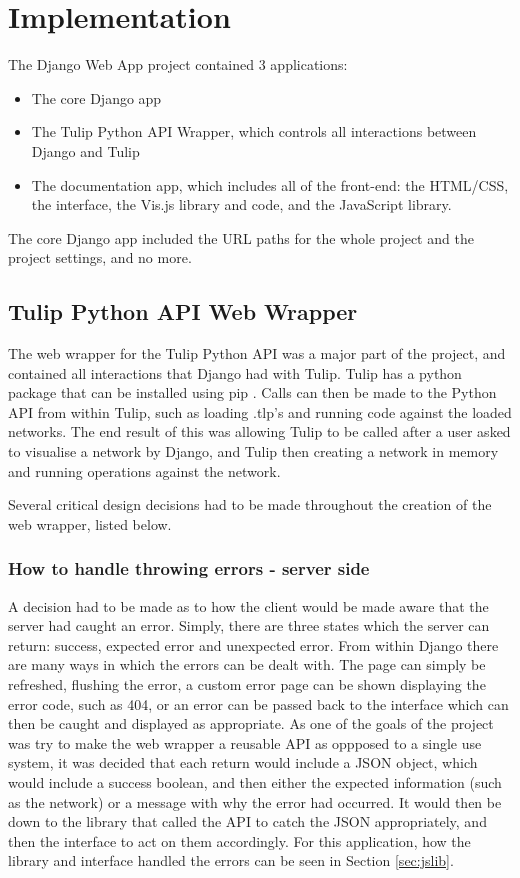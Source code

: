\documentclass[../dissertation.tex]{subfiles}
\begin{document}
\chapter{Implementation}

The Django Web App project contained 3 applications: 

\begin{itemize}
    \item The core Django app
    \item The Tulip Python API Wrapper, which controls all interactions between Django and Tulip
    \item The documentation app, which includes all of the front-end: the HTML/CSS, the interface, the Vis.js library and code, and the JavaScript library.
\end{itemize}

The core Django app included the URL paths for the whole project and the project settings, and no more.

\section{Tulip Python API Web Wrapper}

The web wrapper for the Tulip Python API was a major part of the project, and contained all interactions that Django had with Tulip. Tulip has a python package \cite{tulippip} that can be installed using pip \cite{pip}. Calls can then be made to the Python API from within Tulip, such as loading .tlp's and running code against the loaded networks. The end result of this was allowing Tulip to be called after a user asked to visualise a network by Django, and Tulip then creating a network in memory and running operations against the network. 

Several critical design decisions had to be made throughout the creation of the web wrapper, listed below.

\subsection{How to handle throwing errors - server side}

A decision had to be made as to how the client would be made aware that the server had caught an error. Simply, there are three states which the server can return: success, expected error and unexpected error. From within Django there are many ways in which the errors can be dealt with. The page can simply be refreshed, flushing the error, a custom error page can be shown displaying the error code, such as 404, or an error can be passed back to the interface which can then be caught and displayed as appropriate. As one of the goals of the project was try to make the web wrapper a reusable API as oppposed to a single use system, it was decided that each return would include a JSON object, which would include a success boolean, and then either the expected information (such as the network) or a message with why the error had occurred. It would then be down to the library that called the API to catch the JSON appropriately, and then the interface to act on them accordingly. For this application, how the library and interface handled the errors can be seen in Section \ref{sec:jslib}.
\end{document}
